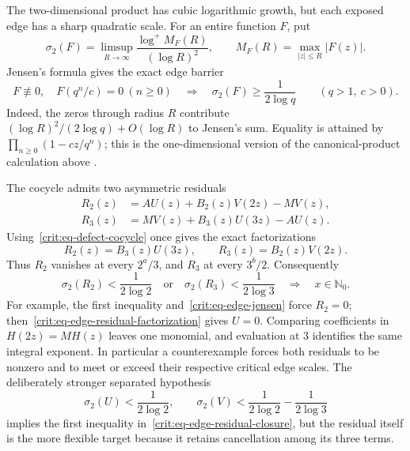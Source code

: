 \documentclass[11pt,oneside]{article}
\theoremstyle{definition}
\theoremstyle{remark}
\newcommand{\Nzero}{\mathbb N_0}
\begin{document}
The two-dimensional product has cubic logarithmic growth, but each exposed edge has a sharp
quadratic scale.  For an entire function $F$, put
\begin{equation}
 \sigma_2(F)=\limsup_{R\to\infty}
 \frac{\log^+M_F(R)}{(\log R)^2},
 \qquad M_F(R)=\max_{|z|\le R}|F(z)|.
 \label{crit:eq-quadratic-type}
\end{equation}
Jensen's formula gives the exact edge barrier
\begin{equation}
 F\not\equiv0,\quad F(q^n/c)=0\ (n\ge0)
 \quad\Longrightarrow\quad
 \sigma_2(F)\ge\frac1{2\log q}
 \qquad(q>1,\ c>0).
 \label{crit:eq-edge-jensen}
\end{equation}
Indeed, the zeros through radius $R$ contribute
$(\log R)^2/(2\log q)+O(\log R)$ to Jensen's sum.  Equality is attained by
$\prod_{n\ge0}(1-cz/q^n)$; this is the one-dimensional version of the canonical-product
calculation above \cite{LevinEntire}.

The cocycle admits two asymmetric residuals
\begin{align}
 R_2(z)&=A U(z)+B_2(z)V(2z)-M V(z),\\
 R_3(z)&=M V(z)+B_3(z)U(3z)-A U(z).
 \label{crit:eq-edge-residuals}
\end{align}
Using~\eqref{crit:eq-defect-cocycle} once gives the exact factorizations
\begin{equation}
 \boxed{R_2(z)=B_3(z)U(3z),\qquad R_3(z)=B_2(z)V(2z).}
 \label{crit:eq-edge-residual-factorization}
\end{equation}
Thus $R_2$ vanishes at every $2^a/3$, and $R_3$ at every $3^b/2$.  Consequently
\begin{equation}
 \boxed{
 \sigma_2(R_2)<\frac1{2\log2}\quad\text{or}\quad
 \sigma_2(R_3)<\frac1{2\log3}
 \quad\Longrightarrow\quad x\in\Nzero.}
 \label{crit:eq-edge-residual-closure}
\end{equation}
For example, the first inequality and~\eqref{crit:eq-edge-jensen} force $R_2=0$;
then~\eqref{crit:eq-edge-residual-factorization} gives $U=0$.  Comparing coefficients in
$H(2z)=MH(z)$ leaves one monomial, and evaluation at $3$ identifies the same integral
exponent.  In particular a counterexample forces both residuals to be nonzero and to meet or
exceed their respective critical edge scales.  The deliberately stronger separated hypothesis
\[
 \sigma_2(U)<\frac1{2\log2},\qquad
 \sigma_2(V)<\frac1{2\log2}-\frac1{2\log3}
\]
implies the first inequality in~\eqref{crit:eq-edge-residual-closure}, but the residual itself
is the more flexible target because it retains cancellation among its three terms.
\end{document}
